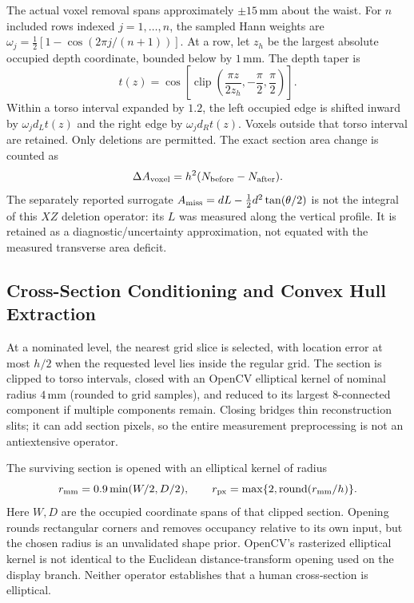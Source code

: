 The actual voxel removal spans approximately $\pm15$\,mm about the waist. For $n$ included rows indexed $j=1,\ldots,n$, the sampled Hann weights are $\omega_j=\tfrac12[1-\cos(2\pi j/(n+1))]$. At a row, let $z_h$ be the largest absolute occupied depth coordinate, bounded below by $1$\,mm. The depth taper is
\begin{equation}
t(z)=\cos\!\left[\operatorname{clip}\left(\frac{\pi z}{2z_h},-\frac\pi2,\frac\pi2\right)\right].
\end{equation}
Within a torso interval expanded by $1.2$, the left occupied edge is shifted inward by $\omega_jd_Lt(z)$ and the right edge by $\omega_jd_Rt(z)$. Voxels outside that torso interval are retained. Only deletions are permitted. The exact section area change is counted as
\begin{equation}
\Delta A_{\rm voxel}=h^2(N_{\rm before}-N_{\rm after}).
\end{equation}
The separately reported surrogate $A_{\rm miss}=dL-\tfrac12d^2\tan(\theta/2)$ is not the integral of this $XZ$ deletion operator: its $L$ was measured along the vertical profile. It is retained as a diagnostic/uncertainty approximation, not equated with the measured transverse area deficit.

\subsection{Cross-Section Conditioning and Convex Hull Extraction}
\label{subsec:shape_regularization}
\label{subsec:girth_extraction}
At a nominated level, the nearest grid slice is selected, with location error at most $h/2$ when the requested level lies inside the regular grid. The section is clipped to torso intervals, closed with an OpenCV elliptical kernel of nominal radius $4$\,mm (rounded to grid samples), and reduced to its largest 8-connected component if multiple components remain. Closing bridges thin reconstruction slits; it can add section pixels, so the entire measurement preprocessing is not an antiextensive operator.

The surviving section is opened with an elliptical kernel of radius
\begin{equation}
r_{\rm mm}=0.9\min(W/2,D/2),\qquad
r_{\rm px}=\max\{2,\operatorname{round}(r_{\rm mm}/h)\}.
\label{eq:disk_radius}
\end{equation}
Here $W,D$ are the occupied coordinate spans of that clipped section. Opening rounds rectangular corners and removes occupancy relative to its own input, but the chosen radius is an unvalidated shape prior. OpenCV's rasterized elliptical kernel is not identical to the Euclidean distance-transform opening used on the display branch. Neither operator establishes that a human cross-section is elliptical.

